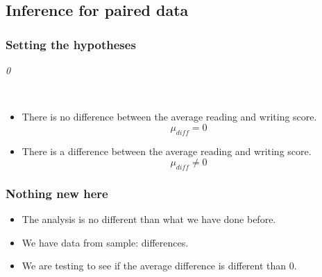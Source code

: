 \documentclass[slidestop,compress,mathserif]{beamer}
\newcommand{\soln}[1]{\textit{#1}}
\begin{document}

\subsection{Inference for paired data}

\begin{frame}
\frametitle{Setting the hypotheses}



\soln{0}

$\:$ \\




\begin{itemize}
\item[$H_0$:] There is no difference between the average reading and writing score. 
\[ \mu_{diff} = 0 \]
\item[$H_A$:] There is a difference between the average reading and writing score. 
\[ \mu_{diff} \ne 0 \]
\end{itemize}

\end{frame}


\begin{frame}
\frametitle{Nothing new here}

\begin{itemize}

\item The analysis is no different than what we have done before.

\item We have data from  sample: differences. 

\item We are testing to see if the average difference is different than 0.

\end{itemize}

\end{frame}

\end{document}
